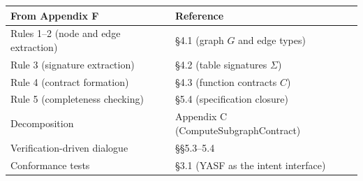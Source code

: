 \begin{tabular}{ll}
\hline
\textbf{From Appendix F} & \textbf{Reference} \\
\hline
Rules 1--2 (node and edge extraction) & \S 4.1 (graph $G$ and edge types) \\
Rule 3 (signature extraction) & \S 4.2 (table signatures $\Sigma$) \\
Rule 4 (contract formation) & \S 4.3 (function contracts $C$) \\
Rule 5 (completeness checking) & \S 5.4 (specification closure) \\
Decomposition & Appendix C (ComputeSubgraphContract) \\
Verification-driven dialogue & \S\S 5.3--5.4 \\
Conformance tests & \S 3.1 (YASF as the intent interface) \\
\hline
\end{tabular}
